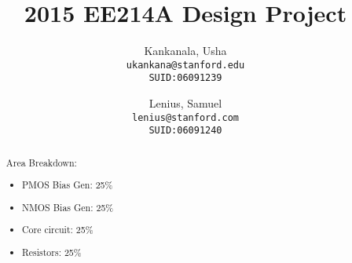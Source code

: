 \documentclass[12pt,english]{article}
\begin{document}

\setcounter{page}{0}



\author{
  Kankanala, Usha\\
  \texttt{ukankana@stanford.edu}\\
  \texttt{SUID:06091239}
  \and
  Lenius, Samuel\\
  \texttt{lenius@stanford.com}\\
  \texttt{SUID:06091240}
}

\title{2015 EE214A Design Project}

\maketitle


\begin{abstract}
  Area Breakdown:
  \begin{addmargin}[1em]{0em}
  \begin{itemize}
    \item PMOS Bias Gen: 25\%
    \item NMOS Bias Gen: 25\%
    \item Core circuit: 25\%
    \item Resistors: 25\%
  \end{itemize}
  \end{addmargin}
\end{abstract}

\pagebreak

\end{document}
